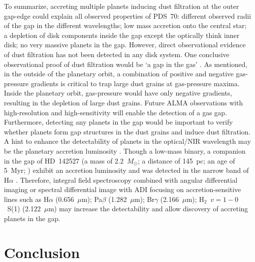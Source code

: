 \documentclass[apj]{emulateapj-rtx4}
\begin{document}
  To summarize, 
  accreting multiple planets inducing dust filtration at the outer gap-edge could explain all observed properties 
  of PDS~70: different observed radii of the gap in the different wavelengths; low mass accretion onto the central star; 
  a depletion of disk components 
  inside the gap except the optically think inner disk; no very massive planets in the gap. However, direct observational evidence 
  of dust filtration has not been detected in any disk system. One conclusive observational proof of dust filtration
  would be `a gap in the gas' 
  \citep[see, e.g., Fig.~7 in][]{deju13}. As mentioned, in the outside of the planetary orbit, a combination of positive and negative 
  gas-pressure gradients is critical to trap large dust grains at gas-pressure maxima. Inside the planetary orbit, gas-pressure would 
  have only negative gradients, resulting in the depletion of large dust grains. Future ALMA observations with high-resolution 
  and high-sensitivity will enable the detection of a gas gap. Furthermore, detecting any planets in the gap 
  would be important to verify whether
  planets form gap structures in the dust grains and induce dust filtration. A hint to enhance the detectability of planets in the 
  optical/NIR wavelength may be the planetary accretion luminosity \citep{owen14}. Though a low-mass binary, a companion in the 
  gap of HD~142527 (a mass of 2.2~$M_{\odot}$; a distance of 145~pc; an age of 5~Myr; \citealt{verh11}) exhibit 
  an accretion luminosity and 
  was detected in the narrow band of H$\alpha$ \citep{clos14}. Therefore, integral field spectroscopy combined with angular differential
  imaging \citep[ADI;][]{maro06} or spectral differential image \citep[SDI;][]{raci99} with ADI focusing on accretion-sensitive lines
  such as H$\alpha$ (0.656~$\mu$m); Pa$\beta$ (1.282~$\mu$m); Br$\gamma$ (2.166~$\mu$m); H$_{2}$~$v$$=$$1-0$~S(1) (2.122~$\mu$m)
  may increase the detectability and allow discovery of accreting planets in the gap.

  \section{Conclusion}\label{sec:conclusion} 
\end{document}
